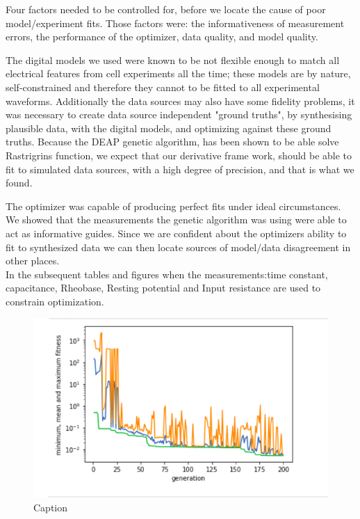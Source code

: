 




Four factors needed to be controlled for, before we locate the cause of poor model/experiment fits. Those factors were: the informativeness of measurement errors, the performance of the optimizer, data quality, and model quality.

The digital models we used were known to be not flexible enough to match all electrical features from cell experiments all the time; these models are by nature, self-constrained and therefore they cannot to be fitted to all experimental waveforms. Additionally the data sources may also have some fidelity problems, it was necessary to create data source independent "ground truths", by synthesising plausible data, with the digital models, and optimizing against these ground truths. Because the DEAP genetic algorithm, has been shown to be able solve Rastrigrins function, we expect that our derivative frame work, should be able to fit to simulated data sources, with a high degree of precision, and that is what we found.


The optimizer was capable of producing perfect fits under ideal circumstances. We showed that the measurements the genetic algorithm was using were able to act as informative guides. Since we are confident about the optimizers ability to fit to synthesized data we can then locate sources of model/data disagreement in other places. \\ 
In the subsequent tables and figures when the measurements:time constant, capacitance, Rheobase, Resting potential and Input resistance are used to constrain optimization.

\begin{figure}
    \centering
    \includegraphics{figures/optimizer_internal_validation}
    \caption{Caption}
    \label{fig:my_label}
\end{figure}

